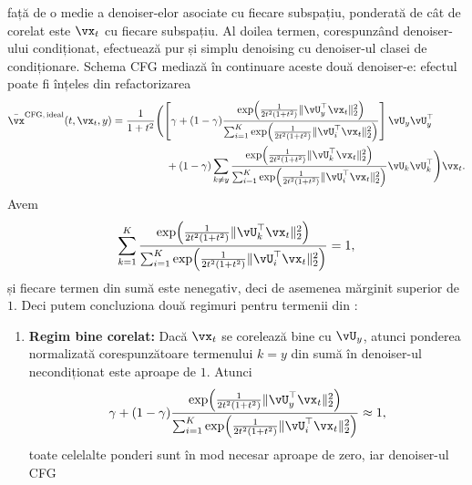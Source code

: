 \documentclass[../../book-main_ro.tex]{subfiles}
\begin{document}
\begin{example}
  față de o medie a denoiser-elor asociate cu fiecare subspațiu, ponderată de
  cât de corelat este $\vx_t$ cu fiecare subspațiu. Al doilea termen, corespunzând
  denoiser-ului condiționat, efectuează pur și simplu denoising cu denoiser-ul
  clasei de condiționare. Schema CFG mediază în continuare aceste două denoiser-e:
  efectul poate fi înțeles din refactorizarea
  \begin{equation}\label{eq:cfg-denoiser-mog-low-rank-2}
    \begin{split}
      \bar{\vx}^{\mathrm{CFG,\,ideal}}(t, \vx_t, y)
      =
      \frac{1}{1 + t^{2}}
      &\Biggl(
      \left[\gamma + (1 - \gamma) 
      \frac{\exp\rp{\frac{1}{2t^{2}(1
      + t^{2})}\norm{\vU_{y}^{\top}\vx_t}_{2}^{2}}}{\sum_{i
      = 1}^{K}\exp\rp{\frac{1}{2t^{2}(1
      + t^{2})}\norm{\vU_{i}^{\top}\vx_t}_{2}^{2}}}
      \right]
      \vU_{y}\vU_{y}^{\top}
      \\
      &\quad+
      (1 - \gamma) 
      \sum_{k \neq y}\frac{\exp\rp{\frac{1}{2t^{2}(1
      + t^{2})}\norm{\vU_{k}^{\top}\vx_t}_{2}^{2}}}{\sum_{i
      = 1}^{K}\exp\rp{\frac{1}{2t^{2}(1
      + t^{2})}\norm{\vU_{i}^{\top}\vx_t}_{2}^{2}}}\vU_{k}\vU_{k}^{\top}
      \Biggr)
      \vx_t.
    \end{split}
  \end{equation}
  Avem
  \begin{equation}
    \sum_{k=1}^K
    \frac{\exp\rp{\frac{1}{2t^{2}(1
    + t^{2})}\norm{\vU_{k}^{\top}\vx_t}_{2}^{2}}}{\sum_{i
    = 1}^{K}\exp\rp{\frac{1}{2t^{2}(1
    + t^{2})}\norm{\vU_{i}^{\top}\vx_t}_{2}^{2}}}
    = 1,
  \end{equation}
  și fiecare termen din sumă este nenegativ, deci de asemenea mărginit superior de $1$.
  Deci putem concluziona două regimuri pentru termenii din
  : 
  \begin{enumerate}
    \item \textbf{Regim bine corelat:} Dacă $\vx_t$ se corelează bine cu
      $\vU_y$, atunci ponderea normalizată corespunzătoare termenului $k=y$ din sumă în
      denoiser-ul necondiționat este aproape de $1$. 
      Atunci 
      \begin{equation}
        \gamma + (1 - \gamma) 
      \frac{\exp\rp{\frac{1}{2t^{2}(1
      + t^{2})}\norm{\vU_{y}^{\top}\vx_t}_{2}^{2}}}{\sum_{i
      = 1}^{K}\exp\rp{\frac{1}{2t^{2}(1
      + t^{2})}\norm{\vU_{i}^{\top}\vx_t}_{2}^{2}}}
        \approx 1,
      \end{equation}
      toate celelalte ponderi sunt în mod necesar aproape de zero, iar denoiser-ul CFG

\end{enumerate}
\end{example}
\end{document}
